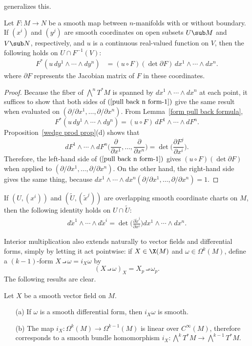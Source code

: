 generalizes this.
\begin{proposition}\label{pull back n form}
Let $F:M\to N$ be a smooth map between $n$-manifolds with or without boundary. If $(x^i)$ and $(y^j)$ are smooth coordinates on open subsets $U\sub M$ and $V\sub N$, respectively, and $u$ is a continuous real-valued function on $V$, then the following holds on $U\cap F^{-1}(V)$:
\begin{align}\label{pull back n form-1}
F^*(u\,dy^1\wedge\cdots\wedge dy^n)&=(u\circ F)(\det\partial F)\,dx^1\wedge\cdots\wedge dx^n.
\end{align}
where $\partial F$ represents the Jacobian matrix of $F$ in these coordinates.
\end{proposition}
\begin{proof}
Because the fiber of $\bigwedge^nT^*M$ is spanned by $dx^1\wedge\cdots\wedge dx^n$ at each point, it suffices to show that both sides of $(\ref{pull back n form-1})$ give the same result when evaluated on $(\partial/\partial x^1,\dots,\partial/\partial x^n)$. From Lemma~\ref{form pull back formula},
\[F^*(u\,dy^1\wedge\cdots\wedge dy^n)=(u\circ F)\,dF^1\wedge\cdots\wedge dF^n.\]
Proposition~\ref{wedge prod prop}(d) shows that
\[dF^1\wedge\cdots\wedge dF^n\Big(\frac{\partial}{\partial x^1},\dots,\frac{\partial}{\partial x^n}\Big)=\det\Big(\frac{\partial F^j}{\partial x^i}\Big).\]
Therefore, the left-hand side of $(\ref{pull back n form-1})$ gives $(u\circ F)(\det\partial F)$ when applied to $(\partial/\partial x^1,\dots,\partial/\partial x^n)$. On the other hand, the right-hand side gives the same thing, because $dx^1\wedge\cdots\wedge dx^n(\partial/\partial x^1,\dots,\partial/\partial x^n)=1$.
\end{proof}
\begin{corollary}
If $(U,(x^i))$ and $(\widetilde{U},(\widetilde{x}^j))$ are overlapping smooth coordinate charts on $M$, then the following identity holds on $U\cap\widetilde{U}$:
\begin{align}\label{form n transition}
d\widetilde{x}^1\wedge\cdots\wedge d\widetilde{x}^i=\det\Big(\frac{\partial\widetilde{x}^j}{\partial x^i}\Big)dx^1\wedge\cdots\wedge dx^n.
\end{align}
\end{corollary}
Interior multiplication also extends naturally to vector fields and differential forms, simply by letting it act pointwise: if $X\in\X(M)$ and $\omega\in\Omega^k(M)$, define a $(k-1)$-form $X\intprod\omega=i_X\omega$ by
\[(X\intprod\omega)_X=X_p\intprod\omega_p.\]
The following results are clear.
\begin{proposition}
Let $X$ be a smooth vector field on $M$.
\begin{itemize}
\item[(a)] If $\omega$ is a smooth differential form, then $i_X\omega$ is smooth.
\item[(b)] The map $i_X:\Omega^k(M)\to\Omega^{k-1}(M)$ is linear over $C^\infty(M)$, therefore corresponds
to a smooth bundle homomorphism $i_X:\bigwedge^kT^*M\to\bigwedge^{k-1}T^*M$.
\end{itemize}
\end{proposition}
